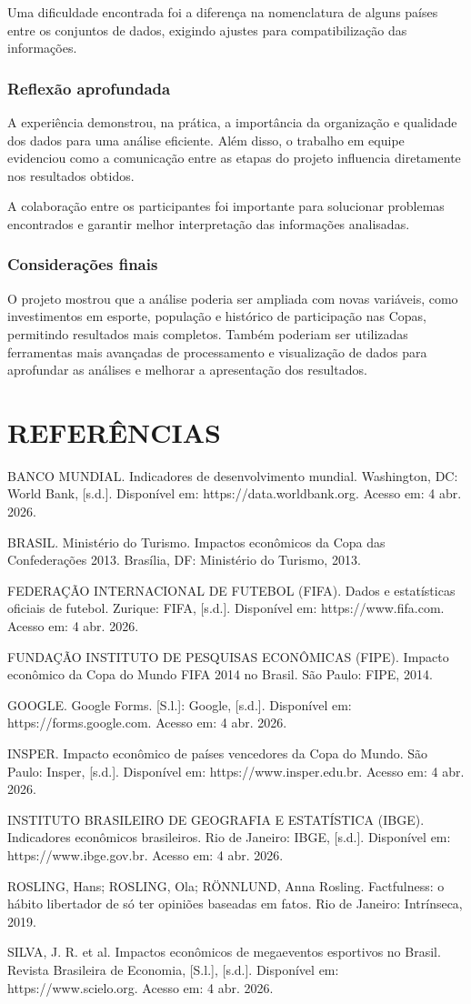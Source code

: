 \documentclass[12pt, a4paper, brazil]{article}
\begin{document}
Uma dificuldade encontrada foi a diferença na nomenclatura de alguns países entre os conjuntos de dados, exigindo ajustes para compatibilização das informações.
\subsubsection{Reflexão aprofundada}
A experiência demonstrou, na prática, a importância da organização e qualidade dos dados para uma análise eficiente. Além disso, o trabalho em equipe evidenciou como a comunicação entre as etapas do projeto influencia diretamente nos resultados obtidos. 

A colaboração entre os participantes foi importante para solucionar problemas encontrados e garantir melhor interpretação das informações analisadas.
\subsubsection{Considerações finais}
O projeto mostrou que a análise poderia ser ampliada com novas variáveis, como investimentos em esporte, população e histórico de participação nas Copas, permitindo resultados mais completos.      Também poderiam ser utilizadas ferramentas mais avançadas de processamento e visualização de dados para aprofundar as análises e melhorar a apresentação dos resultados.
\section{REFERÊNCIAS}
BANCO MUNDIAL. Indicadores de desenvolvimento mundial. Washington, DC: World Bank, [s.d.]. Disponível em: https://data.worldbank.org. Acesso em: 4 abr. 2026.

BRASIL. Ministério do Turismo. Impactos econômicos da Copa das Confederações 2013. Brasília, DF: Ministério do Turismo, 2013.

FEDERAÇÃO INTERNACIONAL DE FUTEBOL (FIFA). Dados e estatísticas oficiais de futebol. Zurique: FIFA, [s.d.]. Disponível em: https://www.fifa.com. Acesso em: 4 abr. 2026.

FUNDAÇÃO INSTITUTO DE PESQUISAS ECONÔMICAS (FIPE). Impacto econômico da Copa do Mundo FIFA 2014 no Brasil. São Paulo: FIPE, 2014.

GOOGLE. Google Forms. [S.l.]: Google, [s.d.]. Disponível em: https://forms.google.com. Acesso em: 4 abr. 2026.

INSPER. Impacto econômico de países vencedores da Copa do Mundo. São Paulo: Insper, [s.d.]. Disponível em: https://www.insper.edu.br. Acesso em: 4 abr. 2026.

INSTITUTO BRASILEIRO DE GEOGRAFIA E ESTATÍSTICA (IBGE). Indicadores econômicos brasileiros. Rio de Janeiro: IBGE, [s.d.]. Disponível em: https://www.ibge.gov.br. Acesso em: 4 abr. 2026.

ROSLING, Hans; ROSLING, Ola; RÖNNLUND, Anna Rosling. Factfulness: o hábito libertador de só ter opiniões baseadas em fatos. Rio de Janeiro: Intrínseca, 2019.

SILVA, J. R. et al. Impactos econômicos de megaeventos esportivos no Brasil. Revista Brasileira de Economia, [S.l.], [s.d.]. Disponível em: https://www.scielo.org. Acesso em: 4 abr. 2026.
\end{document}

